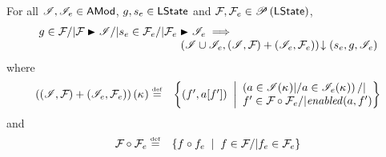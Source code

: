 %
%
%
\begin{lemma}\label{lem:extend-closure}
%
For all $\mathscr{I}{}, \mathscr{I}_{e} \in \textsf{AMod}$, $g, s_e \in \textsf{LState}$ and $\mathcal{F}_{}, \mathcal{F}_{e} \in \mathscr{P}\left(\textsf{LState} \right)$,
\[
\begin{array}{l l}
	g \in \fence{} /| \fence{} \strictfences \lmod /| s_e \in \fence{e} /| \fence{e} \strictfences \lmod_e 
	\implies & \\
	& \hspace{-2cm} \extendsAM{\lmod \cup \lmod_{e}, (\lmod, \fence{}) + (\lmod_{e}, \fence{e}) }{s_{e}}{g}{\lmod_{e}}
\end{array}
\]
%
where
%
\[
\begin{array}{@{} l  l @{}}
	\left( (\lmod, \fence{}) + (\lmod_{e}, \fence{e}) \right)(\ca{}) \eqdef  & 
	\left\{
		(f', a[f']) \;\;\middle|
		\begin{array}{ l @{}}
			\left(a \in \lmod(\ca{}) |/ a \in \lmod_{e}(\ca{})  \right) /| \\
			f' \in \fence{} \composeL \fence{e} /| \m{enabled}(a, f')	
		\end{array}		  
	\right\}\\
\end{array}
\]
%
and
%
\[
\begin{array}{@{} l l @{}}
	\fence{} \composeL \fence{e} \eqdef & 
	\left\{
		f \composeL f_{e} \;\;\middle|\;\; 
		f \in \fence{} /| f_e \in \fence{e}
	\right\}

\end{array}\]
\end{lemma}

